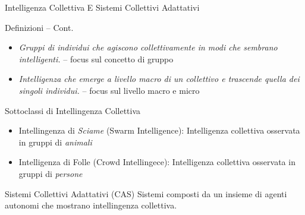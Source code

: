 \documentclass[presentation, 10pt,aspectratio=169]{beamer}\mode<presentation>{\usetheme{AMSBolognaFC}}
\begin{document}
\begin{frame}{Intelligenza Collettiva E Sistemi Collettivi Adattativi}
	\begin{alertblock}{Definizioni -- Cont.}
		\begin{itemize}
			\item \emph{Gruppi di individui che agiscono collettivamente in modi che sembrano intelligenti.} -- focus sul concetto di \alert{gruppo}
			\item \emph{Intelligenza che emerge a livello macro di un collettivo e trascende quella dei singoli individui.} -- focus sul livello \alert{macro} e \alert{micro}
		\end{itemize}
	\end{alertblock}
	\begin{exampleblock}{Sottoclassi di Intellingenza Collettiva}
		\begin{itemize}
			\item Intellingenza di \emph{Sciame} (\alert{Swarm Intelligence}): Intelligenza collettiva osservata in gruppi di \emph{animali}
			\item Intelligenza di Folle (\alert{Crowd Intellingece}): Intelligenza collettiva osservata in gruppi di \emph {persone}
		\end{itemize}
	\end{exampleblock}
	\begin{block}{Sistemi Collettivi Adattativi (CAS)}
		Sistemi composti da un insieme di agenti autonomi che mostrano intellingenza collettiva.
	\end{block}
\end{frame}
\end{document}
